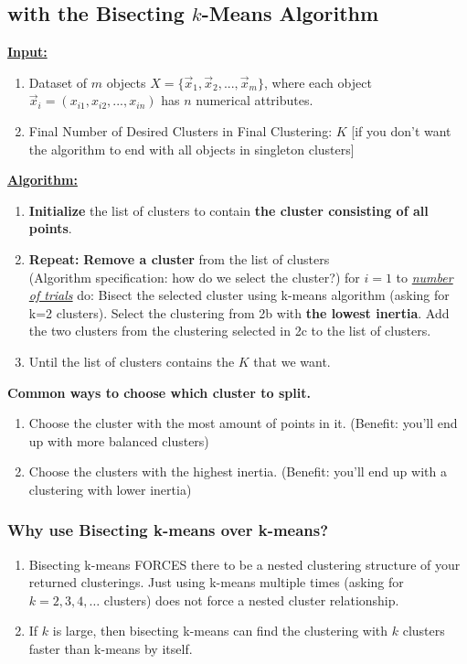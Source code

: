 \documentclass[11pt]{elegantbook}
\begin{document}
\subsection{with the Bisecting $k$-Means Algorithm}
\textbf{\underline{Input:}}
\begin{enumerate}[$\bullet$]
    \item Dataset of $m$ objects $X=\{\vec{x}_1,\vec{x}_2,...,\vec{x}_m\}$, where each object $\vec{x}_i=(x_{i1},x_{i2},...,x_{in})$ has $n$ numerical attributes.
    \item Final Number of Desired Clusters in Final Clustering: $K$ [if you don't want the algorithm to end with all
    objects in singleton clusters]
\end{enumerate}
\textbf{\underline{Algorithm:}}
\begin{enumerate}[1.]
    \item \textbf{Initialize} the list of clusters to contain \textbf{the cluster consisting of all points}.
    \item \textbf{Repeat:}
    \subitem[a.] \textbf{Remove a cluster} from the list of clusters\\ (Algorithm specification: how do we select the cluster?)
    \subitem[b.] for $i = 1$ to \underline{\textit{number of trials}} do: Bisect the selected cluster using k-means algorithm (asking for k=2 clusters).
    \subitem[c.] Select the clustering from 2b with \textbf{the lowest inertia}.
    \subitem[d.] Add the two clusters from the clustering selected in 2c to the list of clusters.
    \item Until the list of clusters contains the $K$ that we want.
\end{enumerate}
\textbf{Common ways to choose which cluster to split.}
\begin{enumerate}[1.]
    \item Choose the cluster with the most amount of points in it. (Benefit: you'll end up with more balanced clusters)
    \item Choose the clusters with the highest inertia. (Benefit: you'll end up with a clustering with lower inertia)
\end{enumerate}

\subsubsection*{Why use Bisecting k-means over k-means?}
\begin{enumerate}[-]
    \item Bisecting k-means FORCES there to be a nested clustering structure of your returned clusterings. Just using k-means multiple times (asking for $k=2,3,4, \ldots$ clusters) does not force a nested cluster relationship.
    \item If $k$ is large, then bisecting k-means can find the clustering with $k$ clusters faster than k-means by itself.
\end{enumerate}
\end{document}
